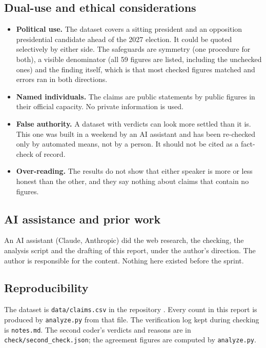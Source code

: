\documentclass[11pt]{article}
\begin{document}
\subsection*{Dual-use and ethical considerations}

\begin{itemize}
\item \textbf{Political use.} The dataset covers a sitting president and an opposition presidential candidate ahead of the 2027 election. It could be quoted selectively by either side. The safeguards are symmetry (one procedure for both), a visible denominator (all 59 figures are listed, including the unchecked ones) and the finding itself, which is that most checked figures matched and errors ran in both directions.
\item \textbf{Named individuals.} The claims are public statements by public figures in their official capacity. No private information is used.
\item \textbf{False authority.} A dataset with verdicts can look more settled than it is. This one was built in a weekend by an AI assistant and has been re-checked only by automated means, not by a person. It should not be cited as a fact-check of record.
\item \textbf{Over-reading.} The results do not show that either speaker is more or less honest than the other, and they say nothing about claims that contain no figures.
\end{itemize}

\subsection*{AI assistance and prior work}

An AI assistant (Claude, Anthropic) did the web research, the checking, the analysis script and the drafting of this report, under the author's direction. The author is responsible for the content. Nothing here existed before the sprint.

\subsection*{Reproducibility}



The dataset is \texttt{data/claims.csv} in the repository \cite{tally}. Every count in this report is produced by \texttt{analyze.py} from that file. The verification log kept during checking is \texttt{notes.md}. The second coder's verdicts and reasons are in \texttt{check/second\_check.json}; the agreement figures are computed by \texttt{analyze.py}.
\end{document}
